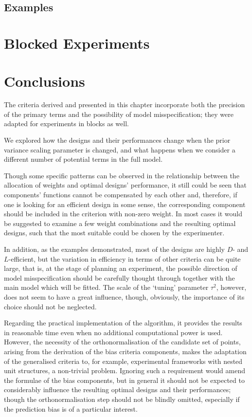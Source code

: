 \subsection{Examples}


\newpage
\section{Blocked Experiments}
\label{sec::gen_blocked}


\section{Conclusions}
The criteria derived and presented in this chapter incorporate both the precision of the primary terms and the possibility of model misspecification; they were adapted for experiments in blocks as well.

We explored how the designs and their performances change when the prior variance scaling parameter is changed, and what happens when we consider a different number of potential terms in the full model.

Though some specific patterns can be observed in the relationship between the allocation of weights and optimal designs' performance, it still could be seen that components' functions cannot be compensated by each other and, therefore, if one is looking for an efficient design in some sense, the corresponding component should be included in the criterion with non-zero weight. In most cases it would be suggested to examine a few weight combinations and the resulting optimal designs, such that the most suitable could be chosen by the experimenter. 

In addition, as the examples demonstrated, most of the designs are highly $D$- and $L$-efficient, but the variation in efficiency in terms of other criteria can be quite large, that  is, at the stage of planning an experiment, the possible direction of model misspecification should be carefully thought through together with the main model which will be fitted. The scale of the `tuning' parameter $\tau^2$, however, does not seem to have a great influence, though, obviously, the importance of its choice should not be neglected.

Regarding the practical implementation of the algorithm, it provides the results in reasonable time even when no additional computational power is used. However, the necessity of the orthonormalisation of the candidate set of points, arising from the derivation of the bias criteria components, makes the adaptation of the generalised criteria to, for example, experimental frameworks with nested unit structures, a non-trivial problem. Ignoring such a requirement would amend the formulae of the bias components, but in general it should not be expected to considerably influence the resulting optimal designs and their performances; though the orthonormalisation step should not be blindly omitted, especially if the prediction bias is of a particular interest. 
      